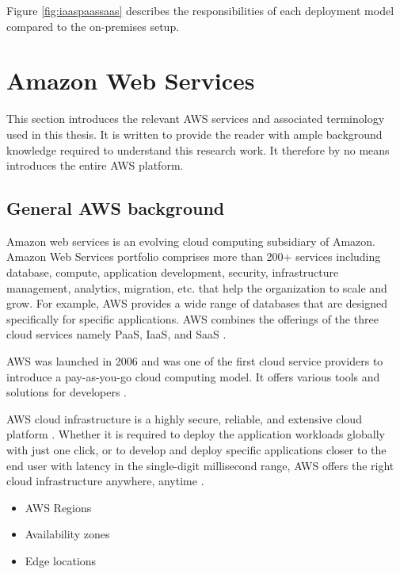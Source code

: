 \par Figure \ref{fig:iaaspaassaas} describes the responsibilities of each deployment model compared to the on-premises setup.

\section{Amazon Web Services}
\par This section introduces the relevant AWS services and associated terminology used in this thesis. It is written to provide the reader with ample background knowledge required to understand this research work. It therefore by no means introduces the entire AWS platform.

\subsection{General AWS background}

\par Amazon web services is an evolving cloud computing subsidiary of Amazon.
Amazon Web
Services portfolio comprises more than 200+ services including database, compute, application
development, security, infrastructure management, analytics, migration, etc.
that help the
organization to scale and grow.
For example, AWS provides a wide range of databases that are
designed specifically for specific applications.
AWS combines the offerings of the three cloud services 
namely PaaS, IaaS, and SaaS \cite{17}.

\par AWS was launched in 2006 and was one of the first
cloud service providers to introduce a pay-as-you-go cloud computing model. It offers various tools and solutions for developers \cite{18}.

\par AWS cloud infrastructure is a highly secure,
reliable, and extensive cloud platform \cite{19}. Whether
it is required to deploy the application workloads
globally with just one click, or to develop and deploy specific applications closer to the end user with latency in the single-digit millisecond range, AWS offers the right cloud infrastructure anywhere, anytime \cite{20}.

\begin{itemize}
    \item AWS Regions
    \item Availability zones
    \item Edge locations
\end{itemize}

